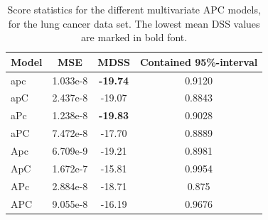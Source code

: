 \begin{table}
    \begin{center}
    \begin{tabular}{l |c c c }
        Model & MSE & MDSS & Contained 95\%-interval\\
        \hline
        apc    & 1.033e-8 & \textbf{-19.74}    & 0.9120 \\
        apC    & 2.437e-8 & -19.07   & 0.8843 \\
        aPc    & 1.238e-8 & \textbf{-19.83}  & 0.9028 \\
        aPC    & 7.472e-8 & -17.70   & 0.8889 \\
        Apc    & 6.709e-9 & -19.21   & 0.8981 \\
        ApC    & 1.672e-7 & -15.81   & 0.9954 \\
        APc    & 2.884e-8 & -18.71   & 0.875  \\
        APC    & 9.055e-8 & -16.19   & 0.9676 \\
    \end{tabular}
    \caption{Score statistics for the different multivariate APC models, for the lung cancer data set. The lowest mean DSS values are marked in bold font. }\label{tbl:mv-APC-lung}
    \end{center}
\end{table}

